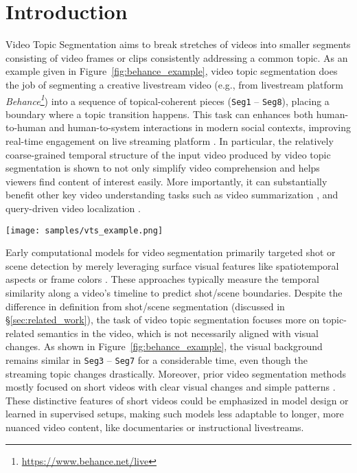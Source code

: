 \documentclass[runningheads]{llncs}
\begin{document}
\section{Introduction}
 
Video Topic Segmentation aims to break stretches of videos into smaller segments consisting of video frames or clips consistently addressing a common topic. As an example given in Figure~\ref{fig:behance_example}, video topic segmentation does the job of segmenting a creative
livestream video (e.g., from livestream platform \textit{Behance\footnote{\url{https://www.behance.net/live}}}) into a sequence of
topical-coherent pieces (\texttt{Seg1} -- \texttt{Seg8}), placing a boundary where a topic transition happens. This task can enhances both human-to-human and human-to-system interactions in modern social contexts, improving real-time engagement on live streaming platform \cite{Faser_chi_20}. In particular, the relatively coarse-grained temporal structure of the input video produced by video topic segmentation is shown to not only simplify video comprehension and helps viewers find content of interest easily. 
More importantly, it can substantially benefit other key video understanding tasks such as video summarization \cite{qiu_etal_2022}, and query-driven video localization \cite{xiao2021boundary}.


\begin{figure*}[t]
    \centering
    \texttt{[image: samples/vts\_example.png]}
    \caption{A Behance exemplar about making a choking victim poster. 
    The left side of the figure illustrates the video's timeline after topic segmentation. The right side shows the transcript with words indicating a segment's topic \textbf{\textcolor{cardinal}{highlighed}}.} %
    \label{fig:behance_example}
\end{figure*}


Early computational models for video segmentation primarily targeted shot or scene detection by merely leveraging surface visual features like spatiotemporal aspects or frame colors \cite{Rui1998ExploringVS,Rasheed2003SceneDI,rao2020local,Chen2021ShotCS}. These approaches typically measure the temporal similarity along a video's timeline to predict shot/scene boundaries. 
Despite the difference in definition from shot/scene segmentation (discussed in \S\ref{sec:related_work}),
the task of video topic segmentation focuses more on topic-related semantics in the video, which is not necessarily aligned with visual changes. As shown in Figure~\ref{fig:behance_example}, the visual background remains similar in \texttt{Seg3} -- \texttt{Seg7} for a considerable time, even though the streaming topic changes drastically.
Moreover, prior video segmentation methods mostly focused on short videos with clear visual changes and simple patterns \cite{GygliECCV14,slow-dinesh-2016,9250764}.
These distinctive features of short videos could be emphasized in model design or learned in supervised setups, making such models less adaptable to longer, more nuanced video content, like documentaries or instructional livestreams.
\end{document}
